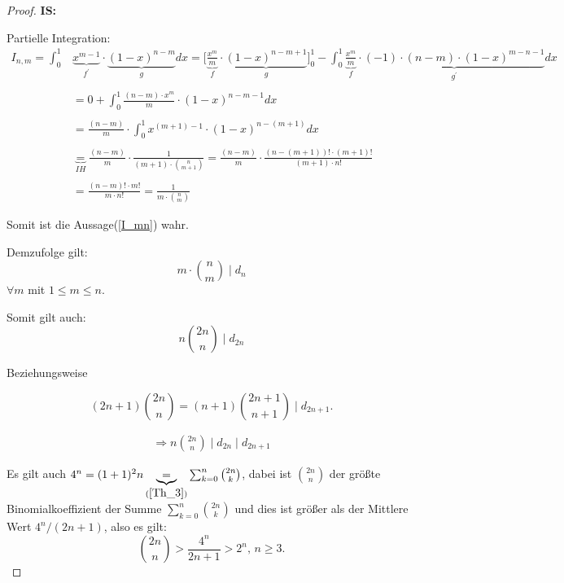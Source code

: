 \documentclass[12pt,oneside]{article}
\theoremstyle{remark}
\theoremstyle{definition}
\begin{document}
\begin{proof}
\textbf{IS: }

Partielle Integration:\newline\newline
\begin{align*}
    I_{n,m} = \int_{0}^{1} &\underbrace{x^{m - 1}}_{f^{'}} \cdot \underbrace{(1 - x)^{n - m}}_{g} dx =\Big[ \underbrace{\frac{x^{m}}{m}}_{f} \cdot \underbrace{(1 - x)^{n - m + 1}}_{g}\Big]_0^1 - \int_{0}^{1} \underbrace{\frac{x^{m}}{m}}_{f} \cdot \underbrace{(-1 )\cdot (n - m) \cdot (1 -x)^{m - n - 1}}_{g^{'}} dx \\
    \\
    &= 0 +  \int_{0}^{1} \frac{(n - m) \cdot x^{m}}{m} \cdot (1 - x)^{n - m - 1} dx \\
    \\
    &= \frac{(n - m )}{m} \cdot \int_{0}^{1} x^{(m + 1) - 1} \cdot (1-x)^{n - (m + 1)} dx \\
    \\
    &\underbrace{=}_{IH} \frac{(n - m )}{m} \cdot \frac{1}{(m + 1) \cdot {n \choose m + 1}} = \frac{(n - m)}{m} \cdot \frac{(n - (m + 1))! \cdot (m + 1)!}{(m + 1) \cdot n!} \\ 
    \\ 
    &= \frac{(n - m )! \cdot m!}{m \cdot n!} = \frac{1}{m \cdot {n \choose m}} 
\end{align*}

Somit ist die Aussage(\ref{I_mn}) wahr.\newline 

Demzufolge gilt: 
\begin{equation}
    m \cdot {n \choose m} \mid d_{n}
\end{equation}
$\forall m $ mit $1 \leq m \leq n $.\newline

Somit gilt auch: 
\begin{equation}\label{d2n}
    n {2n\choose n} \mid d_{2n}
\end{equation}

Beziehungsweise 

\begin{equation}\label{d2n1}
    (2n + 1) {2n \choose n} = (n + 1) {2n + 1 \choose n + 1} \mid d_{2n + 1}. 
\end{equation}

\begin{align*}
\Rightarrow n {2n \choose n}\mid d_{2n}\mid d_{2n + 1}
\end{align*}
\smallskip

Es gilt auch $4^n = (1 + 1)^2n \underbrace{=}_{(\ref{Th_3})} \sum_{k = 0}^{n} {2n \choose k}$, dabei ist ${2n \choose n}$ der größte Binomialkoeffizient der Summe $\sum_{k = 0}^{n} {2n \choose k}$ und dies ist größer als der Mittlere Wert $4^n /(2n + 1)$, also es gilt:\newline\newline
\begin{equation}\label{estim_4n_bin}
    {2n \choose n} > \frac{4^n}{2n + 1} > 2^n, \,  n \geq 3.
\end{equation}


\end{proof}
\end{document}
